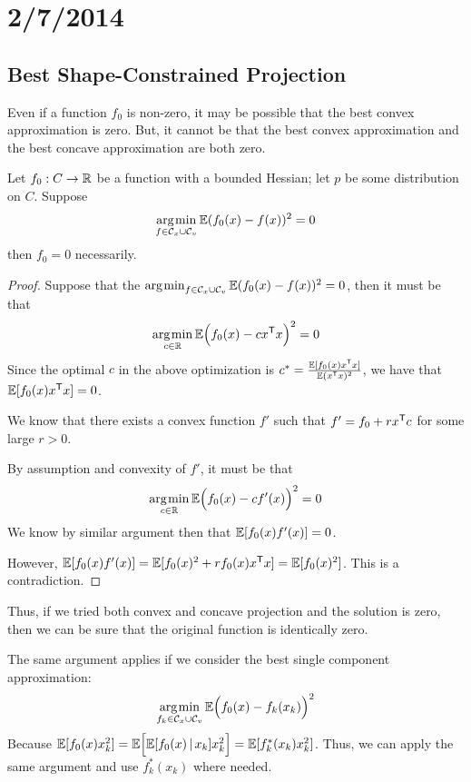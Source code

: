\documentclass{article}
\begin{document}
\section{2/7/2014}

\subsection{Best Shape-Constrained Projection}

Even if a function $f_0$ is non-zero, it may be possible that the best convex approximation is zero. But, it cannot be that the best convex approximation and the best concave approximation are both zero.

\begin{theorem}
Let $f_0: C \rightarrow \mathbb{R}$ be a function with a bounded Hessian; let $p$ be some distribution on $C$.
Suppose 
\[
\mathop{\rm arg\kern.2ex min}_{f \in \mathcal{C}_x \cup \mathcal{C}_v} 
   \mathbb{E} (f_0(x) - f(x))^2  = 0
\]
 then $f_0 = 0$ necessarily.
\end{theorem}

\begin{proof}

Suppose that the $\mathop{\rm arg\kern.2ex min}_{f \in \mathcal{C}_x \cup \mathcal{C}_v} \mathbb{E}( f_0(x) - f(x))^2 = 0$, then it must be that 
\[
\mathop{\rm arg\kern.2ex min}_{c \in \mathbb{R}} \mathbb{E}\Big( f_0(x) - c x^{\mathsf{T}} x \Big)^2 = 0
\]
Since the optimal $c$ in the above optimization is 
$c^* = \frac{\mathbb{E}[ f_0(x) x^{\mathsf{T}} x ]}{\mathbb{E} (x^{\mathsf{T}} x)^2 }$, 
we have that $\mathbb{E}[ f_0(x) x^{\mathsf{T}} x]=0$.

We know that there exists a convex function $f'$ such that $f' = f_0 + r x^{\mathsf{T}} c$ for some large $r > 0$. 

By assumption and convexity of $f'$, it must be that 
\[
\mathop{\rm arg\kern.2ex min}_{c \in \mathbb{R}} \mathbb{E}\Big( f_0(x) - c f'(x) \Big)^2 = 0
\]
We know by similar argument then that $\mathbb{E}[ f_0(x) f'(x) ] =0$. 

However, $\mathbb{E}[ f_0(x) f'(x) ] = \mathbb{E}[f_0(x)^2 + r f_0(x) x^{\mathsf{T}} x ] = \mathbb{E}[ f_0(x)^2]$. This is a contradiction. 

\end{proof}

Thus, if we tried both convex and concave projection and the solution is zero, then we can be sure that the original function is identically zero.

The same argument applies if we consider the best single component approximation:
\[
\mathop{\rm arg\kern.2ex min}_{f_k \in \mathcal{C}_x \cup \mathcal{C}_v} 
\mathbb{E}\Big( f_0(x) - f_k(x_k) \Big)^2
\]
Because $\mathbb{E}[ f_0(x) x_k^2 ] = \mathbb{E}\Big[ \mathbb{E}[f_0(x) \,|\, x_k] x_k^2\Big] 
= \mathbb{E}[ f^*_k(x_k) x_k^2]$.
Thus, we can apply the same argument and use $f^*_k(x_k)$ where needed.
\end{document}

